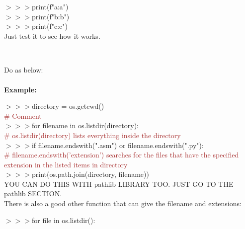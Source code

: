 \documentclass[a4paper,18pt]{article}
\begin{document}
$>>>$\hspace*{28pt}print(f"a:{a}")\\

$>>>$\hspace*{28pt}print(f"b:{b}")\\

$>>>$\hspace*{28pt}print(f"c:{c}")\\

Just test it to see how it works.\\\\




\subsection{\colorbox {matgreen}{\color{white}{\large To Loop over files in a directory}}}
Do as below:\\\\
\textbf{Example:\\}

$>>>$directory = os.getcwd()\\{\textcolor{brown}{\# Comment}}\\

$>>>$for filename in os.listdir(directory):\\{\textcolor{brown}{\# os.listdir(directory) lists everything inside the directory}}\\

$>>>$\hspace*{28pt}if filename.endswith(".asm") or filename.endswith(".py"):\\{\textcolor{brown}{\# filename.endswith('extension') searches for the files that have the specified extension in the listed items in directory}}\\

$>>>$\hspace*{42pt}print(os.path.join(directory, filename))\\

YOU CAN DO THIS WITH pathlib LIBRARY TOO. JUST GO TO THE pathlib SECTION.\\

There is also a good other function that can give the filename and extensions:

$>>>$for file in os.listdir():\\
\end{document}
